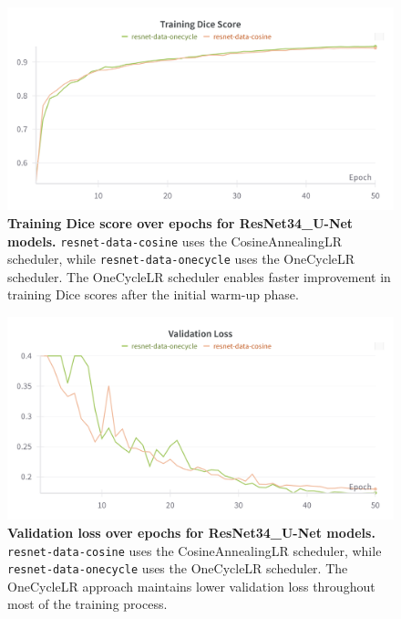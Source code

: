 \documentclass[twocolumn,a4paper]{article}
\begin{document}
\begin{figure}[H]
\centering
\includegraphics[width=0.95\linewidth]{figs/lr_resnet_train_dice}
\caption{\textbf{Training Dice score over epochs for ResNet34\_U-Net models.} \texttt{resnet-data-cosine} uses the CosineAnnealingLR scheduler, while \texttt{resnet-data-onecycle} uses the OneCycleLR scheduler. The OneCycleLR scheduler enables faster improvement in training Dice scores after the initial warm-up phase.}
\label{fig:lrresnettraindice}
\end{figure}
\begin{figure}[H]
\centering
\includegraphics[width=0.95\linewidth]{figs/lr_resnet_val_loss}
\caption{\textbf{Validation loss over epochs for ResNet34\_U-Net models.} \texttt{resnet-data-cosine} uses the CosineAnnealingLR scheduler, while \texttt{resnet-data-onecycle} uses the OneCycleLR scheduler. The OneCycleLR approach maintains lower validation loss throughout most of the training process.}
\label{fig:lrresnetvalloss}
\end{figure}
\end{document}
